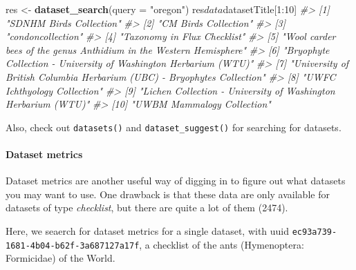 \documentclass[author-year, review, 11pt]{components/elsarticle} %
\newenvironment{Shaded}{\begin{snugshade}}{\end{snugshade}}
\newcommand{\KeywordTok}[1]{\textcolor[rgb]{0.13,0.29,0.53}{\textbf{{#1}}}}
\newcommand{\DataTypeTok}[1]{\textcolor[rgb]{0.13,0.29,0.53}{{#1}}}
\newcommand{\DecValTok}[1]{\textcolor[rgb]{0.00,0.00,0.81}{{#1}}}
\newcommand{\StringTok}[1]{\textcolor[rgb]{0.31,0.60,0.02}{{#1}}}
\newcommand{\CommentTok}[1]{\textcolor[rgb]{0.56,0.35,0.01}{\textit{{#1}}}}
\newcommand{\NormalTok}[1]{{#1}}
\begin{document}
\begin{Shaded}
\begin{Highlighting}[]
\NormalTok{res <-}\StringTok{ }\KeywordTok{dataset_search}\NormalTok{(}\DataTypeTok{query =} \StringTok{"oregon"}\NormalTok{)}
\NormalTok{res$data$datasetTitle[}\DecValTok{1}\NormalTok{:}\DecValTok{10}\NormalTok{]}
\CommentTok{#>  [1] "SDNHM Birds Collection"                                                }
\CommentTok{#>  [2] "CM Birds Collection"                                                   }
\CommentTok{#>  [3] "condoncollection"                                                      }
\CommentTok{#>  [4] "Taxonomy in Flux Checklist"                                            }
\CommentTok{#>  [5] "Wool carder bees of the genus Anthidium in the Western Hemisphere"     }
\CommentTok{#>  [6] "Bryophyte Collection - University of Washington Herbarium (WTU)"       }
\CommentTok{#>  [7] "University of British Columbia Herbarium (UBC) - Bryophytes Collection"}
\CommentTok{#>  [8] "UWFC Ichthyology Collection"                                           }
\CommentTok{#>  [9] "Lichen Collection - University of Washington Herbarium (WTU)"          }
\CommentTok{#> [10] "UWBM Mammalogy Collection"}
\end{Highlighting}
\end{Shaded}

Also, check out \texttt{datasets()} and \texttt{dataset\_suggest()} for
searching for datasets.

\paragraph{Dataset metrics}\label{dataset-metrics}

Dataset metrics are another useful way of digging in to figure out what
datasets you may want to use. One drawback is that these data are only
available for datasets of type \emph{checklist}, but there are quite a
lot of them (2474).

Here, we seaerch for dataset metrics for a single dataset, with uuid
\texttt{ec93a739-1681-4b04-b62f-3a687127a17f}, a checklist of the ants
(Hymenoptera: Formicidae) of the World.

\begin{Shaded}
\end{Shaded}
\end{document}

